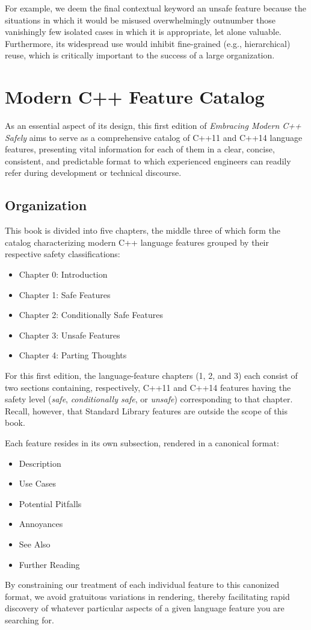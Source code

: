 For example, we deem the final contextual keyword an unsafe feature because the situations in which it would be misused overwhelmingly outnumber those vanishingly few isolated cases in which it is appropriate, let alone valuable. Furthermore, its widespread use would inhibit fine-grained (e.g., hierarchical) reuse, which is critically important to the success of a large organization.

\section{Modern C++ Feature Catalog}

As an essential aspect of its design, this first edition of \textit{Embracing Modern C++ Safely} aims to serve as a comprehensive catalog of C++11 and C++14 language features, presenting vital information for each of them in a clear, concise, consistent, and predictable format to which experienced engineers can readily refer during development or technical discourse.

\subsection{Organization}

This book is divided into five chapters, the middle three of which form the catalog characterizing modern C++ language features grouped by their respective safety classifications:
\begin{itemize}
\item{ Chapter 0: Introduction}
\item{Chapter 1: Safe Features}
\item{Chapter 2: Conditionally Safe Features}
\item{Chapter 3: Unsafe Features}
\item{Chapter 4: Parting Thoughts}
\end{itemize}
For this first edition, the language-feature chapters (1, 2, and 3) each consist of two sections containing, respectively, C++11 and C++14 features having the safety level (\textit{safe}, \textit{conditionally safe}, or \textit{unsafe}) corresponding to that chapter. Recall, however, that Standard Library features are outside the scope of this book.

Each feature resides in its own subsection, rendered in a canonical format:
\begin{itemize}
\item{Description}
\item{Use Cases}
\item{Potential Pitfalls}
\item{Annoyances}
\item{See Also}
\item{Further Reading}
\end{itemize}
By constraining our treatment of each individual feature to this canonized format, we avoid gratuitous variations in rendering, thereby facilitating rapid discovery of whatever particular aspects of a given language feature you are searching for.


